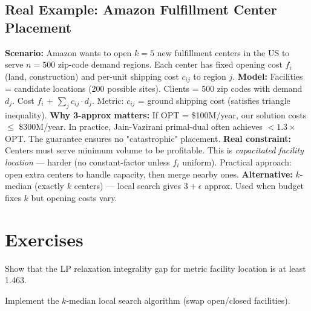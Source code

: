 \subsection*{Real Example: Amazon Fulfillment Center Placement}
\textbf{Scenario:} Amazon wants to open $k=5$ new fulfillment centers in the US to serve $n=500$ zip-code demand regions. Each center has fixed opening cost $f_i$ (land, construction) and per-unit shipping cost $c_{ij}$ to region $j$.
\textbf{Model:} Facilities = candidate locations (200 possible sites). Clients = 500 zip codes with demand $d_j$. Cost $f_i$ + $\sum_j c_{ij} \cdot d_j$. Metric: $c_{ij}$ = ground shipping cost (satisfies triangle inequality).
\textbf{Why 3-approx matters:} If OPT = \$100M/year, our solution costs $\leq$ \$300M/year. In practice, Jain-Vazirani primal-dual often achieves $< 1.3\times$ OPT. The guarantee ensures no "catastrophic" placement.
\textbf{Real constraint:} Centers must serve minimum volume to be profitable. This is \emph{capacitated facility location} — harder (no constant-factor unless $f_i$ uniform). Practical approach: open extra centers to handle capacity, then merge nearby ones.
\textbf{Alternative:} $k$-median (exactly $k$ centers) — local search gives $3+\epsilon$ approx. Used when budget fixes $k$ but opening costs vary.

\section{Exercises}
\begin{exercise}
Show that the LP relaxation integrality gap for metric facility location is at least 1.463.
\end{exercise}
\begin{exercise}
Implement the $k$-median local search algorithm (swap open/closed facilities).
\end{exercise}

